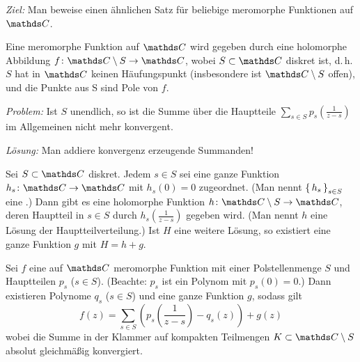 \emph{Ziel:} Man beweise einen ähnlichen Satz für beliebige meromorphe Funktionen auf $\CC$.

\begin{erin}
Eine meromorphe Funktion auf $\CC$ wird gegeben durch eine holomorphe Abbildung $f\colon \CC\setminus S \ra \CC$, wobei $S\subset \CC$ diskret ist, d.\,h. $S$ hat in $\CC$ keinen Häufungspunkt (insbesondere ist $\CC\setminus S$ offen), und die Punkte aus S sind Pole von $f$.
\end{erin}

\emph{Problem:} Ist $S$ unendlich, so ist die Summe über die Hauptteile $\sum _{s \in S} p_s(\frac{1}{z-s})$ im Allgemeinen nicht mehr konvergent.

\emph{Lösung:} Man addiere konvergenz erzeugende Summanden!

\begin{satz-list}\label{satz:mittag-leffler}
\item Sei $S\subset\CC$ diskret. Jedem $s \in S$ sei eine ganze Funktion $h_s\colon \CC \ra \CC$ mit $h_s(0) = 0$ zugeordnet.
(Man nennt $\left\{\,h_s\,\right\}_{s \in S}$ eine .)
Dann gibt es eine holomorphe Funktion $h\colon \CC\setminus S \ra \CC$, deren Hauptteil in $s\in S$ durch $h_s(\frac{1}{z-s})$ gegeben wird.
(Man nennt $h$ eine Lösung der Hauptteilverteilung.)
Ist $H$ eine weitere Lösung, so existiert eine ganze Funktion $g$ mit $H = h + g$.
\item Sei $f$ eine auf $\CC$ meromorphe Funktion mit einer Polstellenmenge $S$ und Hauptteilen $p_s$ ($s\in S$).
(Beachte: $p_s$ ist ein Polynom mit $p_s(0) = 0$.)
Dann existieren Polynome $q_s$ ($s \in S$) und eine ganze Funktion $g$, sodass gilt
\[
	f(z) = \sum \limits _{s\in S} \left(p_s\left(\frac{1}{z-s}\right) - q_s(z)\right) + g(z)
\]
wobei die Summe in der Klammer auf kompakten Teilmengen $K \subset \CC \setminus S$ absolut gleichmäßig konvergiert.
\end{satz-list}

